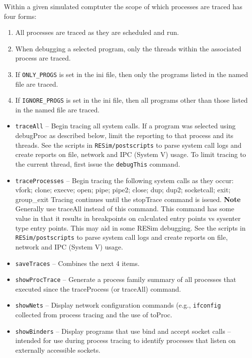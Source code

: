 \documentclass[titlepage]{article}
\begin{document}
Within a given simulated comptuter the scope of which processes are traced has four forms:
\begin{enumerate}
\item All processes are traced as they are scheduled and run.
\item When debugging a selected program, only the threads within the associated process are traced.
\item If {\tt ONLY\_PROGS} is set in the ini file, then only the programs listed in the named file are traced.
\item If {\tt IGNORE\_PROGS} is set in the ini file, then all programs other than those listed in the named file are traced.
\end{enumerate}

\begin{itemize}
\item {\tt traceAll} – Begin tracing all system calls.  If a program was selected using debugProc as described below, limit the reporting to that process and its threads.  
See the scripts in {\tt RESim/postscripts} to parse system call logs and create reports on file, network and IPC (System V) usage.
To limit tracing to the current thread, first issue the {\tt debugThis} command.
\item {\tt traceProcesses} – Begin tracing the following system calls as they occur:
vfork; clone; execve;  open; pipe; pipe2; close; dup; dup2; socketcall; exit; group\_exit
Tracing continues until the stopTrace command is issued.  
\textbf{Note} Generally use traceAll instead of this command.  This command has some value in that it results in breakpoints on calculated entry points vs
sysenter type entry points.  This may aid in some RESim debugging.
See the scripts in {\tt RESim/postscripts} to parse system call logs and create reports on file, network and IPC (System V) usage.

\item {\tt saveTraces} -- Combines the next 4 items.
\item {\tt showProcTrace} – Generate a process family summary of all processes that executed since the traceProcess (or traceAll) command.

\item {\tt showNets} – Display network configuration commands (e.g., {\tt ifconfig} collected from process tracing and the use of toProc.

\item {\tt showBinders} – Display programs that use bind and accept socket calls – intended for use during process tracing to identify processes that listen on externally accessible sockets.


\end{itemize}
\end{document}
